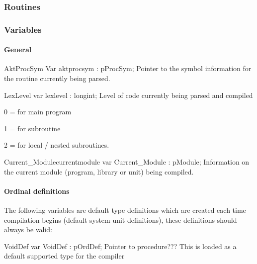 \documentclass [12pt]{article}
\begin{document}
\subsubsection{Routines}
\label{subsubsec:routinesnterfaceecla}

\subsubsection{Variables}
\label{subsubsec:variablesterfaceecla}

\paragraph{General}

\begin{variable}{AktProcSym}
\Declaration
Var aktprocsym : pProcSym;
\Description
Pointer to the symbol information for the routine currently being parsed. 
\end{variable}

\begin{variable}{LexLevel}
\Declaration
var lexlevel : longint;
\Description
Level of code currently being parsed and compiled  \par 0 = for main program
\par 1 = for subroutine \par 2 = for local / nested subroutines.
\end{variable}

\begin{variablel}{Current{\_}Module}{currentmodule}
\Declaration
var Current{\_}Module : pModule;
\Description
Information on the current module (program, library or unit) being compiled.
\end{variablel}

\paragraph{Ordinal definitions}

The following variables are default type definitions which are created each 
time compilation begins (default system-unit definitions), these definitions 
should always be valid:

\begin{variable}{VoidDef}
\Declaration
var VoidDef : pOrdDef;
\Description 
Pointer to procedure??? 
\Notes
This is loaded as a default supported type for the compiler 
\end{variable}
\end{document}
